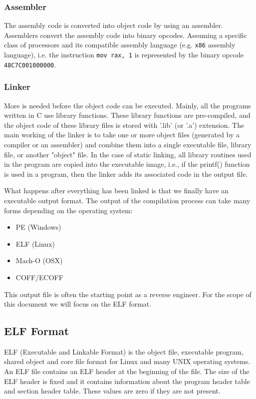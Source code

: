 \documentclass{article}
\begin{document}
\subsubsection{Assembler}

The assembly code is converted into object code by using an assembler. Assemblers convert the assembly code into
binary opcodes. Assuming a specific class of processors and its compatible assembly language (e.g. 
\texttt{x86} assembly language), i.e. the instruction \texttt{mov rax, 1} is represented by the binary opcode
\texttt{48C7C001000000}.

\subsubsection{Linker}

More is needed before the object code can be executed. Mainly, all the programs written in C use library functions. 
These library functions are pre-compiled, and the object code of these library files is stored with '.lib' (or '.a') 
extension. The main working of the linker is to take one or more object files 
(generated by a compiler or an assembler) and combine them into a single executable file,
library file, or another "object" file. In the case of static linking,
all library routines used in the program are copied into the executable image,
i.e., if the printf() function is used in a program, then the linker adds its associated code in the output file. 

\noindent\linebreak
What happens after everything has been linked is that we finally have an executable output format. The output of the
compilation process can take many forms depending on the operating system:
\begin{itemize}
\item PE (Windows)
\item ELF (Linux)
\item Mach-O (OSX)
\item COFF/ECOFF
\end{itemize}
This output file is often the starting point as a reverse engineer. For the scope of this document we will
focus on the ELF format.

\subsection{ELF Format}

ELF (Executable and Linkable Format) is the object file, executable program, shared object and core file format 
for Linux and many UNIX operating systems. An ELF file contains an ELF header at the beginning of the file. 
The size of the ELF header is fixed and it contains information about the program header table and section header table. 
These values are zero if they are not present. \citep{elf}
\end{document}
